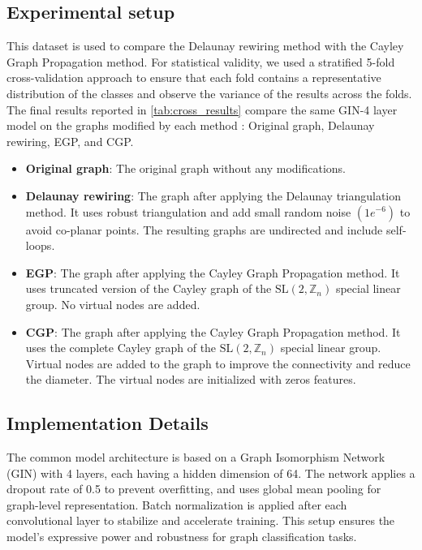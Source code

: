 \documentclass{article}
\theoremstyle{plain}
\theoremstyle{definition}
\theoremstyle{remark}
\begin{document}
\subsection{Experimental setup}
This dataset is used to compare the Delaunay rewiring method with the Cayley Graph Propagation method.
For statistical validity, we used a stratified 5-fold cross-validation approach 
to ensure that each fold contains a representative distribution of the classes 
and observe the variance of the results across the folds. The final results
reported in \cref{tab:cross_results} compare the  same GIN-4 layer model 
on the graphs modified by each method : Original graph, Delaunay rewiring, EGP, and CGP.
\begin{itemize}
    \item \textbf{Original graph}: The original graph without any modifications.
    \item \textbf{Delaunay rewiring}: The graph after applying the Delaunay triangulation method.
        It uses robust triangulation and add small random noise $(1e^{-6})$ to avoid co-planar points.
        The resulting graphs are undirected and include self-loops. 
    \item \textbf{EGP}: The graph after applying the Cayley Graph Propagation method.
        It uses  truncated version of the Cayley graph of the $\text{SL}(2,\mathbb{Z}_n)$ special linear group.
        No virtual nodes are added.
        
    \item \textbf{CGP}: The graph after applying the Cayley Graph Propagation method.
        It uses the complete Cayley graph of the $\text{SL}(2,\mathbb{Z}_n)$ special linear group.
        Virtual nodes are added to the graph to improve the connectivity and reduce the diameter.
        The virtual nodes are initialized with zeros features.
\end{itemize}

\subsection{Implementation Details}
The common model architecture is based on a Graph Isomorphism Network (GIN) with 4 layers,
each having a hidden dimension of 64. The network applies a dropout rate of 0.5 to prevent overfitting,
and uses global mean pooling for graph-level representation. Batch normalization 
is applied after each convolutional layer to stabilize and accelerate training.
This setup ensures the model's expressive power and robustness for graph classification tasks.
\end{document}
